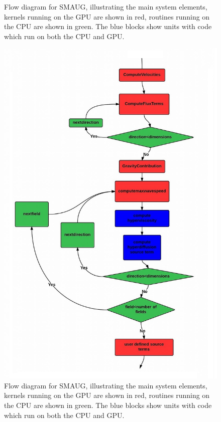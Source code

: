 \begin{figure}[h]
\caption{ Flow diagram for SMAUG,  illustrating the main system elements, kernels running on the GPU are shown in red, routines running on the CPU are shown in green. The blue blocks show units with code which run on both the CPU and GPU.}
\end{figure}





\begin{figure}[h]
\includegraphics[scale=1.5]{fig2_smaug_integrationkernels-flowdiagram.jpg}
\caption{ Flow diagram for SMAUG,  illustrating the main system elements, kernels running on the GPU are shown in red, routines running on the CPU are shown in green. The blue blocks show units with code which run on both the CPU and GPU.}
\end{figure}












